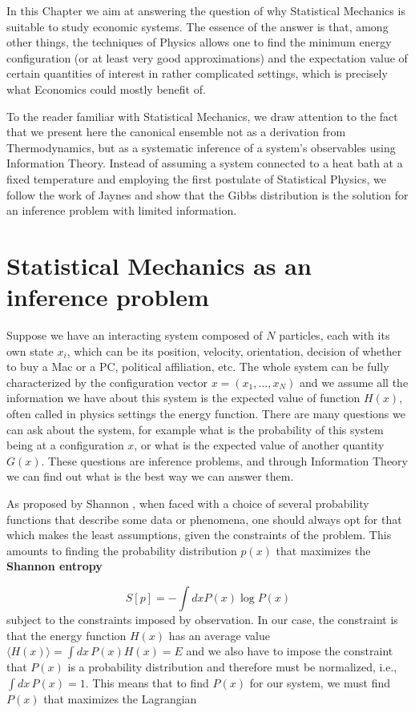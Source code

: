 In this Chapter we aim at answering the question of why Statistical Mechanics is suitable to study economic systems. The essence of the answer is that, among other things, the techniques of Physics allows one to find the minimum energy configuration (or at least very good approximations) and the expectation value of certain quantities of interest in rather complicated settings, which is precisely what Economics could mostly benefit of. 

To the reader familiar with Statistical Mechanics, we draw attention to the fact that we present here the canonical ensemble not as a derivation from Thermodynamics, but as a systematic inference of a system's observables using Information Theory. Instead of assuming a system connected to a heat bath at a fixed temperature and employing the first postulate of Statistical Physics, we follow the work of Jaynes \cite{Jaynes57} and show that the Gibbs distribution is the solution for an inference problem with limited information.

\section{Statistical Mechanics as an inference problem}

Suppose we have an interacting system composed of $N$ particles, each with its own state $x_i$, which can be its position, velocity, orientation, decision of whether to buy a Mac or a PC, political affiliation, etc. The whole system can be fully characterized by the configuration vector $x = (x_1, \ldots, x_N)$ and we assume all the information we have about this system is the expected value of function $H(x)$, often called in physics settings the energy function. There are many questions we can ask about the system, for example what is the probability of this system being at a configuration $x$, or what is the expected value of another quantity $G(x)$. These questions are inference problems, and through Information Theory we can find out what is the best way we can answer them.

As proposed by Shannon \cite{shannon1948}, when faced with a choice of several probability functions that describe some data or phenomena, one should always opt for that which makes the least assumptions, given the constraints of the problem. This amounts to finding the probability distribution $p(x)$ that maximizes the \textbf{Shannon entropy}

\begin{equation}
    S[p] = - \int dx P(x) \log P(x)
\end{equation}
subject to the constraints imposed by observation. In our case, the constraint is that the energy function $H(x)$ has an average value $\langle H(x) \rangle = \int dx \, P(x) H(x) = E$ and we also have to impose the constraint that $P(x)$ is a probability distribution and therefore must be normalized, i.e., $\int dx \, P(x) = 1$. This means that to find $P(x)$ for our system, we must find $P(x)$ that maximizes the Lagrangian

